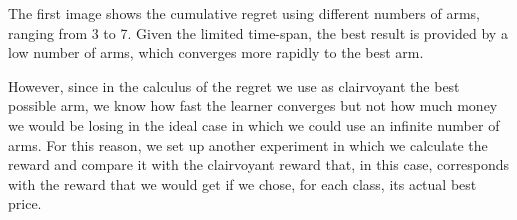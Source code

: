 
The first image shows the cumulative regret using different numbers of arms, ranging from 3 to 7.
Given the limited time-span, the best result is provided by a low number of arms, which converges more rapidly to the best arm.

However, since in the calculus of the regret we use as clairvoyant the best possible arm, we know how fast the learner converges but not how much money we would be losing in the ideal case in which we could use an infinite number of arms. For this reason, we set up another experiment in which we calculate the reward and compare it with the clairvoyant reward that, in this case, corresponds with the reward that we would get if we chose, for each class, its actual best price.

